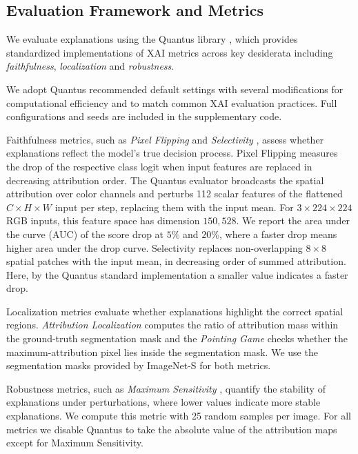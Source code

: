 

\subsection{Evaluation Framework and Metrics} \label{subsec:eval_framework}

We evaluate explanations using the Quantus library \citep{Hedstrom2023}, which provides standardized implementations of XAI metrics across key desiderata including \emph{faithfulness}, \emph{localization} and \emph{robustness}.

We adopt Quantus recommended default settings with several modifications for computational efficiency and to match common XAI evaluation practices. Full configurations and seeds are included in the supplementary code.              

Faithfulness metrics, such as \emph{Pixel Flipping} \citep{Bach2015} and \emph{Selectivity} \citep{Montavon2018}, assess whether explanations reflect the model's true decision process. Pixel Flipping measures the drop of           
the respective class logit when input features are replaced in decreasing attribution order. The Quantus evaluator broadcasts the spatial attribution over color channels and perturbs 112 scalar features of the flattened $C\times H\times W$ input per step, replacing them with the input mean. For $3\times224\times224$ RGB inputs, this feature space has dimension $150{,}528$. We report the area under the curve (AUC) of the score drop at $5\%$ and $20\%$, where a faster drop means higher area under the drop curve. Selectivity replaces non-overlapping $8\times8$ spatial patches with the input mean, in decreasing order of summed attribution.
Here, by the Quantus standard implementation a smaller value indicates a faster drop.

Localization metrics evaluate whether explanations highlight the correct spatial regions. \emph{Attribution Localization} \citep{Kohlbrenner2020} computes the ratio of attribution mass within the ground-truth segmentation          
mask and the \emph{Pointing Game} \citep{Zhang2018pointinggame} checks whether the maximum-attribution pixel lies inside the segmentation mask.
We use the segmentation masks provided by ImageNet-S for both metrics.

Robustness metrics, such as \emph{Maximum Sensitivity} \citep{Yeh2019}, quantify the stability of explanations under perturbations, where lower values indicate more stable explanations. We compute this metric with 25 random             
samples per image.
For all metrics we disable Quantus to take the absolute value of the attribution maps 
except for Maximum Sensitivity.

